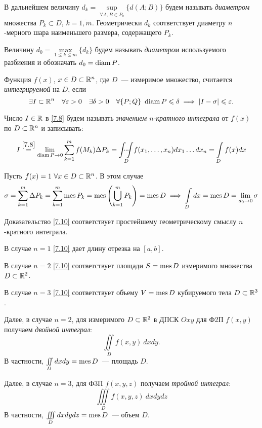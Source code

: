 \documentclass[../../main.tex]{subfiles}
\begin{document}
В дальнейшем величину $d_k = \underset{\forall A, B \in 
P_k}\sup \{d(A; B)\}$
будем называть \emph{диаметром} множества $P_k \subset 
D$, $k = \overline{1, m}$. 
Геометрически $d_k$ соответствует диаметру $n$-мерного шара
наименьшего размера, содержащего $P_k$.

Величину ${d_0 = \underset{1 \le k \le m}\max \{d_k\}}$ 
будем называть \emph{диаметром} используемого разбиения и
обозначать $d_0 = \operatorname{diam} P$.

Функция $f(x)$, $x \in D \subset \mathbb{R}^n$, где $D$~--- измеримое
множество, считается \emph{интегрируемой} на $D$, если
\begin{equation}
\label{7.8}
\exists I \subset \R^n \quad
\forall \eps > 0 \quad \exists \delta > 0 \quad 
\forall \{P; Q\} \ 
\diam P \le \delta \implies \abs{I  - \sigma} \le \eps.
\end{equation}

Число $ I \in \mathbb{R} $ в \eqref{7.8}
будем называть \emph{значением $n$-кратного интеграла} от 
$f(x)$ по $D \subset \mathbb{R}^n$ и записывать:

\begin{equation}
	I \stk{7.8} = \lim_{\diam P\to 0} \sum_{k=1}^m f(M_k) \Delta P_k
	= \underset{D}{\idotsint} f(x_1, \ldots, x_n) d x_1 \ldots dx_n =
	 \int\limits_{D}f(x)dx
\end{equation}


\begin{example}
	Пусть $f(x) = 1\ \forall x \in D \subset \mathbb{R}^n$. В этом случае
	\begin{equation}
	\label{7.10}
	\sigma = \sum\limits_{k = 1}^m\Delta{P_k} = 
	\sum\limits_{k=1}^m \operatorname{mes} P_k =
	\operatorname{mes}\left(\bigcup\limits_{k = 1}^m P_k\right) = \operatorname{mes} D
	\implies \int\limits_D dx = \operatorname{mes} D = \lim\limits_{d_0 \to 0} \sigma
	\end{equation}
	
	Доказательство \eqref{7.10} соответствует 
	простейшему геометрическому смыслу $n$-кратного 
	интеграла.
	
	В случае $n = 1$ \eqref{7.10} дает длину отрезка на $[a, b]$.
	
	В случае $n = 2$ \eqref{7.10} соответствует площади $S = \operatorname{mes} D$ 
	измеримого множества $D \subset \mathbb{R}^2$.
	
	В случае $n = 3$ \eqref{7.10} соответствует объему $V = \operatorname{mes} D$
	кубируемого тела $D \subset \mathbb{R}^3$.
	
	Далее, в случае $n=2$, для измеримого $D \subset \mathbb{R}^2$ в ДПСК 
	$Oxy$ для Ф2П $f(x, y)$ получаем \emph{двойной интеграл}:
	\[
		\iint\limits_D f(x, y)\:dxdy.
	\]
	В частности, $\iint\limits_D dxdy = \operatorname{mes} D$~--- площадь $D$.
	
	Далее, в случае $n=3$, для Ф3П $f(x, y, z)$ получаем 
	\emph{тройной интеграл}:
	\[
	\iiint\limits_D f(x,y,z)\:dxdydz
	\]
	В частности, $\iiint\limits_D dxdydz = \operatorname{mes} D$~--- объем $D$.
\end{example}
\end{document}
